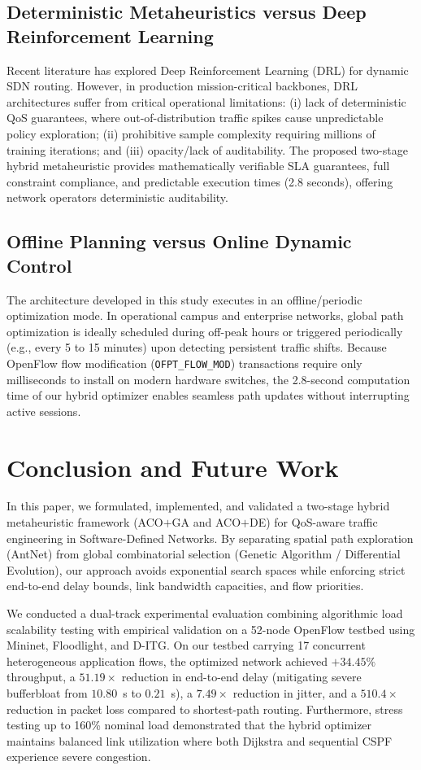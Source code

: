 \documentclass[journal]{IEEEtran}
\begin{document}
\subsection{Deterministic Metaheuristics versus Deep Reinforcement Learning}
Recent literature has explored Deep Reinforcement Learning (DRL) for dynamic SDN routing. However, in production mission-critical backbones, DRL architectures suffer from critical operational limitations: (i) lack of deterministic QoS guarantees, where out-of-distribution traffic spikes cause unpredictable policy exploration; (ii) prohibitive sample complexity requiring millions of training iterations; and (iii) opacity/lack of auditability. The proposed two-stage hybrid metaheuristic provides mathematically verifiable SLA guarantees, full constraint compliance, and predictable execution times (2.8 seconds), offering network operators deterministic auditability.

\subsection{Offline Planning versus Online Dynamic Control}
The architecture developed in this study executes in an offline/periodic optimization mode. In operational campus and enterprise networks, global path optimization is ideally scheduled during off-peak hours or triggered periodically (e.g., every 5 to 15 minutes) upon detecting persistent traffic shifts. Because OpenFlow flow modification (\texttt{OFPT\_FLOW\_MOD}) transactions require only milliseconds to install on modern hardware switches, the 2.8-second computation time of our hybrid optimizer enables seamless path updates without interrupting active sessions.

\section{Conclusion and Future Work}
\label{sec:conclusion}
In this paper, we formulated, implemented, and validated a two-stage hybrid metaheuristic framework (ACO$+$GA and ACO$+$DE) for QoS-aware traffic engineering in Software-Defined Networks. By separating spatial path exploration (AntNet) from global combinatorial selection (Genetic Algorithm / Differential Evolution), our approach avoids exponential search spaces while enforcing strict end-to-end delay bounds, link bandwidth capacities, and flow priorities.

We conducted a dual-track experimental evaluation combining algorithmic load scalability testing with empirical validation on a 52-node OpenFlow testbed using Mininet, Floodlight, and D-ITG. On our testbed carrying 17 concurrent heterogeneous application flows, the optimized network achieved $+34.45\%$ throughput, a $51.19\times$ reduction in end-to-end delay (mitigating severe bufferbloat from $10.80$~s to $0.21$~s), a $7.49\times$ reduction in jitter, and a $510.4\times$ reduction in packet loss compared to shortest-path routing. Furthermore, stress testing up to 160\% nominal load demonstrated that the hybrid optimizer maintains balanced link utilization where both Dijkstra and sequential CSPF experience severe congestion.
\end{document}
